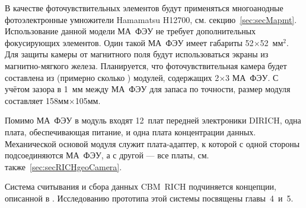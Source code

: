 В качестве фоточувствительных элементов будут применяться многоанодные фотоэлектронные умножители Hamamatsu H12700, см. секцию~\ref{sec:secMapmt}. Использование данной модели МА~ФЭУ не требует дополнительных фокусирующих элементов.
Один такой МА~ФЭУ имеет габариты 52$\times$52~мм$^2$. Для защиты камеры от магнитного поля будут использоваться экраны из магнитно-мягкого железа.
Планируется, что фоточувствительная камера будет составлена из (примерно сколько \todo) модулей, содержащих 2$\times$3 МА~ФЭУ. С учётом зазора в 1~мм между МА~ФЭУ для запаса по точности, размер модуля составляет 158мм$\times$105мм.


Помимо МА~ФЭУ в модуль входят 12~плат передней электроники DIRICH, одна плата, обеспечивающая питание, и одна плата концентрации данных. Механической основой модуля служит плата-адаптер, к которой с одной стороны подсоединяются МА~ФЭУ, а с другой --- все платы, см. также~\ref{sec:secRICHgeoCamera}. 



Система считывания и сбора данных CBM~RICH подчиняется концепции, описанной в \todo. Исследованию прототипа этой системы посвящены главы~4~и~5.

